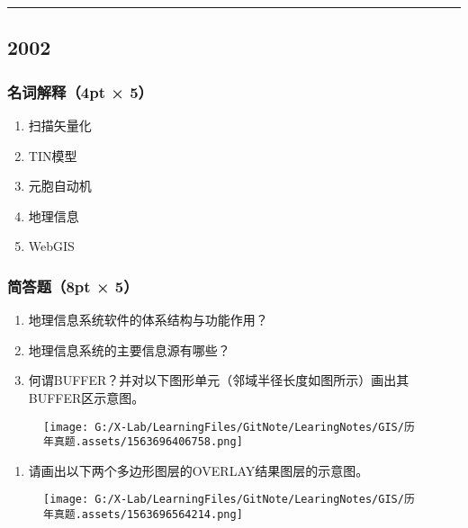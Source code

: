 \documentclass[]{article}
\begin{document}
\begin{center}\rule{0.5\linewidth}{\linethickness}\end{center}

\hypertarget{header-n136}{%
\subsection{2002}\label{header-n136}}

\hypertarget{header-n137}{%
\subsubsection{名词解释（4pt × 5）}\label{header-n137}}

\begin{enumerate}
\def\labelenumi{\arabic{enumi}.}
\item
  扫描矢量化
\item
  TIN模型
\item
  元胞自动机
\item
  地理信息
\item
  WebGIS
\end{enumerate}

\hypertarget{header-n149}{%
\subsubsection{简答题（8pt × 5）}\label{header-n149}}

\begin{enumerate}
\def\labelenumi{\arabic{enumi}.}
\item
  地理信息系统软件的体系结构与功能作用？
\item
  地理信息系统的主要信息源有哪些？
\item
  何谓BUFFER？并对以下图形单元（邻域半径长度如图所示）画出其BUFFER区示意图。
\end{enumerate}

\begin{figure}
\centering
\texttt{[image: G:/X-Lab/LearningFiles/GitNote/LearingNotes/GIS/历年真题.assets/1563696406758.png]}
\caption{}
\end{figure}

\begin{enumerate}
\def\labelenumi{\arabic{enumi}.}
\item
  请画出以下两个多边形图层的OVERLAY结果图层的示意图。
\end{enumerate}

\begin{figure}
\centering
\texttt{[image: G:/X-Lab/LearningFiles/GitNote/LearingNotes/GIS/历年真题.assets/1563696564214.png]}
\caption{}
\end{figure}
\end{document}
